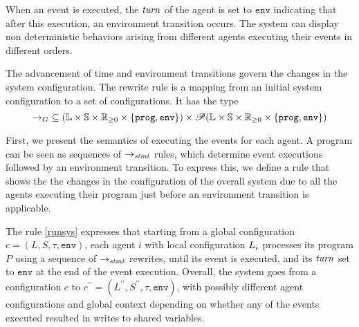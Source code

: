

When an event is executed, the $\mathit{turn}$ of the agent is set to $\mathtt{env}$ indicating that after this execution, an environment transition occurs. The system can display non deterministic behaviors arising from different agents executing their events in different orders.


The advancement of time and environment transitions govern the changes in the system configuration.
The rewrite rule is a mapping from an initial system configuration to a set of configurations.
It has the type
$$\rightarrow_G\ \subseteq (\mathbb{L}\times \pws \times \nnreals \times \{\mathtt{prog,env}\}) \times \mathscr{P}(\mathbb{L}\times\pws \times \nnreals\times \{\mathtt{prog,env}\}) $$

First, we present the semantics of executing the events for each agent.
A \lgname program can be seen as sequences of $\rightarrow_\mathit{stmt}$ rules, which determine event executions followed by an environment transition.
To express this, we define a rule that shows the the changes in the configuration of the overall system due to all the agents executing their program just before an environment transition is applicable.

The rule \ref{runsys} expresses that starting from a global configuration $c = ({L}, S, \tau, \mathtt{env})$, each agent $i$ with local configuration $L_{i}$ processes its program $P$ using a sequence of $\rightarrow_\mathit{stmt}$ rewrites, until its event is executed, and its $\mathit{turn}$ set to $\mathtt{env}$ at the end of the event execution. Overall, the system goes from a configuration $c$ to $c^{\prime\prime}= ({L^{\prime\prime}}, S^{\prime\prime}, \tau, \mathtt{env})$, with possibly different agent configurations and global context depending on whether any of the events executed resulted in writes to shared variables.



